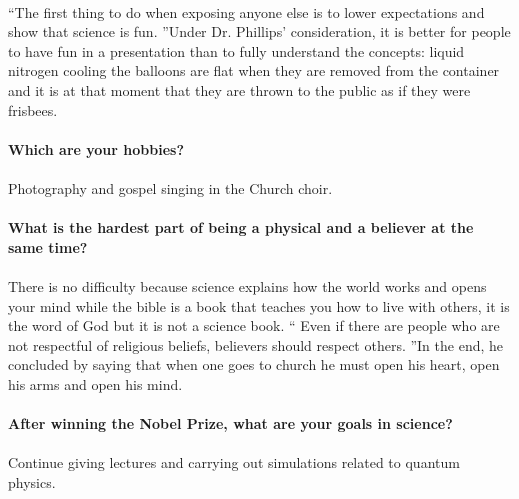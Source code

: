 \documentclass[10pt,letterpaper]{article}
\begin{document}
\\
``The first thing to do when exposing anyone else is to lower expectations and show that science is fun. ”Under Dr. Phillips' consideration, it is better for people to have fun in a presentation than to fully understand the concepts: liquid nitrogen cooling the balloons are flat when they are removed from the container and it is at that moment that they are thrown to the public as if they were frisbees.
\\
\\
\textbf{Which are your hobbies?}
\\
\\
Photography and gospel singing in the Church choir.
\\
\\
\textbf{What is the hardest part of being a physical and a believer at the same time?}
\\
\\
There is no difficulty because science explains how the world works and opens your mind while the bible is a book that teaches you how to live with others, it is the word of God but it is not a science book. `` Even if there are people who are not respectful of religious beliefs, believers should respect others. ”In the end, he concluded by saying that when one goes to church he must open his heart, open his arms and open his mind.
\\
\\
\textbf{After winning the Nobel Prize, what are your goals in science?}
\\
\\
Continue giving lectures and carrying out simulations related to quantum physics.
\end{document}
